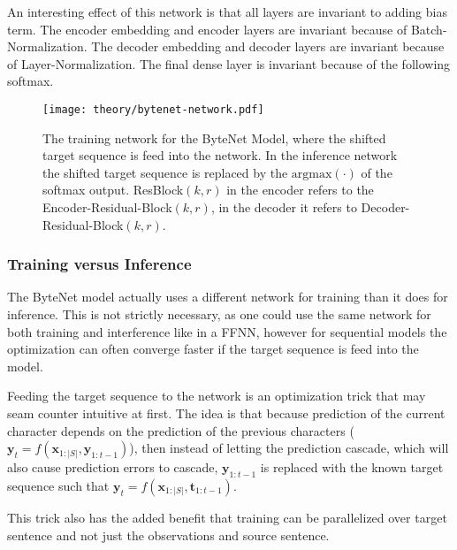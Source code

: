 An interesting effect of this network is that all layers are invariant to adding bias term. The encoder embedding and encoder layers are invariant because of Batch-Normalization. The decoder embedding and decoder layers are invariant because of Layer-Normalization. The final dense layer is invariant because of the following softmax.

\begin{figure}[H]
    \centering
    \texttt{[image: theory/bytenet-network.pdf]}
    \caption{The training network for the ByteNet Model, where the shifted target sequence is feed into the network. In the inference network the shifted target sequence is replaced by the $\mathrm{argmax}(\cdot)$ of the softmax output. ResBlock$(k, r)$ in the encoder refers to the Encoder-Residual-Block$(k, r)$, in the decoder it refers to Decoder-Residual-Block$(k, r)$.}
    \label{fig:bytenet:network}
\end{figure}

\subsubsection{Training versus Inference}
The ByteNet model actually uses a different network for training than it does for inference. This is not strictly necessary, as one could use the same network for both training and interference like in a FFNN, however for sequential models the optimization can often converge faster if the target sequence is feed into the model.

Feeding the target sequence to the network is an optimization trick that may seam counter intuitive at first. The idea is that because prediction of the current character depends on the prediction of the previous characters ($\mathbf{y}_t = f(\mathbf{x}_{1:|S|}, \mathbf{y}_{1:t-1})$), then instead of letting the prediction cascade, which will also cause prediction errors to cascade, $\mathbf{y}_{1:t-1}$ is replaced with the known target sequence such that $\mathbf{y}_t = f(\mathbf{x}_{1:|S|}, \mathbf{t}_{1:t-1})$.

This trick also has the added benefit that training can be parallelized over target sentence and not just the observations and source sentence. 

